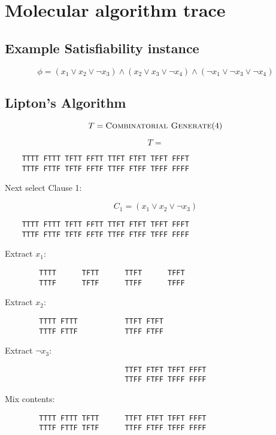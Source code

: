 
\chapter{Molecular algorithm trace}

\section{Example {\sc Satisfiability} instance}


\[
 \phi = (x_1 \vee x_2 \vee \neg x_3) \wedge  (x_2 \vee x_3 \vee \neg x_4) \wedge (\neg x_1 \vee \neg x_3 \vee \neg x_4)
\]


\section{Lipton's Algorithm}

\[
T  = \text{{\sc Combinatorial Generate}}(4)
\]

\[
T = 
\]
\begin{verbatim}
	TTTT FTTT TFTT FFTT TTFT FTFT TFFT FFFT
	TTTF FTTF TFTF FFTF TTFF FTFF TFFF FFFF
\end{verbatim}
	
Next select Clause 1:

\[
C_1 = (x_1 \vee x_2 \vee \neg x_3)
\]

\begin{verbatim}
	TTTT FTTT TFTT FFTT TTFT FTFT TFFT FFFT
	TTTF FTTF TFTF FFTF TTFF FTFF TFFF FFFF
\end{verbatim}
	
	Extract $x_1$:

\begin{verbatim}
		TTTT      TFTT      TTFT      TFFT     
		TTTF      TFTF      TTFF      TFFF     
\end{verbatim}

	Extract $x_2$:
\begin{verbatim}
		TTTT FTTT           TTFT FTFT          
		TTTF FTTF           TTFF FTFF          
\end{verbatim}

	Extract $\neg x_3$:
\begin{verbatim}	
		                    TTFT FTFT TFFT FFFT
		                    TTFF FTFF TFFF FFFF
\end{verbatim}		                    

	Mix contents:

\begin{verbatim}	
		TTTT FTTT TFTT      TTFT FTFT TFFT FFFT
		TTTF FTTF TFTF      TTFF FTFF TFFF FFFF
\end{verbatim}		

